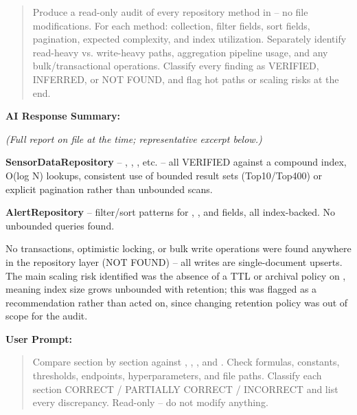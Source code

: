 \documentclass[conference]{IEEEtran}
\begin{document}
\begin{quote}
Produce a read-only audit of every repository method in \texttt{} -- no file modifications. For each method: collection, filter fields, sort fields, pagination, expected complexity, and index utilization. Separately identify read-heavy vs. write-heavy paths, aggregation pipeline usage, and any bulk/transactional operations. Classify every finding as VERIFIED, INFERRED, or NOT FOUND, and flag hot paths or scaling risks at the end.
\end{quote}

\noindent\textbf{AI Response Summary:}\par

\textit{(Full report on file at the time; representative excerpt below.)}

\textbf{SensorDataRepository} -- \texttt{}, \texttt{}, \texttt{}, etc. -- all VERIFIED against a compound \texttt{} index, O(log N) lookups, consistent use of bounded result sets (Top10/Top400) or explicit pagination rather than unbounded scans.

\textbf{AlertRepository} -- filter/sort patterns for \texttt{}, \texttt{}, and \texttt{} fields, all index-backed. No unbounded queries found.

No transactions, optimistic locking, or bulk write operations were found anywhere in the repository layer (NOT FOUND) -- all writes are single-document upserts. The main scaling risk identified was the absence of a TTL or archival policy on \texttt{}, meaning index size grows unbounded with retention; this was flagged as a recommendation rather than acted on, since changing retention policy was out of scope for the audit.

\par\vspace{4pt}\par\vspace{2pt}

\noindent\textbf{User Prompt:}\par

\begin{quote}
Compare \texttt{} section by section against \texttt{}, \texttt{}, \texttt{}, and \texttt{}. Check formulas, constants, thresholds, endpoints, hyperparameters, and file paths. Classify each section CORRECT / PARTIALLY CORRECT / INCORRECT and list every discrepancy. Read-only -- do not modify anything.
\end{quote}
\end{document}
